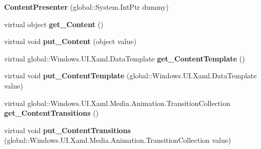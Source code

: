 \begin{DoxyCompactItemize}
{\bfseries Content\+Presenter} (global\+::\+System.\+Int\+Ptr dummy)
\item 
\mbox{\label{class_windows_1_1_u_i_1_1_xaml_1_1_controls_1_1_content_presenter_ace25dbfb4a1344628f258b49b6684b60}} 
virtual object {\bfseries get\+\_\+\+Content} ()
\item 
\mbox{\label{class_windows_1_1_u_i_1_1_xaml_1_1_controls_1_1_content_presenter_a3810290b145067dd2f414f610fac22f6}} 
virtual void {\bfseries put\+\_\+\+Content} (object value)
\item 
\mbox{\label{class_windows_1_1_u_i_1_1_xaml_1_1_controls_1_1_content_presenter_a030cf13f51de73d513e0eb6d3bd1a244}} 
virtual global\+::\+Windows.\+U\+I.\+Xaml.\+Data\+Template {\bfseries get\+\_\+\+Content\+Template} ()
\item 
\mbox{\label{class_windows_1_1_u_i_1_1_xaml_1_1_controls_1_1_content_presenter_a04897e69fee95e8cef678c4d33d68cc1}} 
virtual void {\bfseries put\+\_\+\+Content\+Template} (global\+::\+Windows.\+U\+I.\+Xaml.\+Data\+Template value)
\item 
\mbox{\label{class_windows_1_1_u_i_1_1_xaml_1_1_controls_1_1_content_presenter_a7c18cd7aea309583f3316d93b3806aff}} 
virtual global\+::\+Windows.\+U\+I.\+Xaml.\+Media.\+Animation.\+Transition\+Collection {\bfseries get\+\_\+\+Content\+Transitions} ()
\item 
\mbox{\label{class_windows_1_1_u_i_1_1_xaml_1_1_controls_1_1_content_presenter_a6c2f730bfeb5bf81e86705be31b97742}} 
virtual void {\bfseries put\+\_\+\+Content\+Transitions} (global\+::\+Windows.\+U\+I.\+Xaml.\+Media.\+Animation.\+Transition\+Collection value)
\item 
\mbox{\label{class_windows_1_1_u_i_1_1_xaml_1_1_controls_1_1_content_presenter_ae3da9c59b5e71dc152d5473039d18ef7}} 

\end{DoxyCompactItemize}
